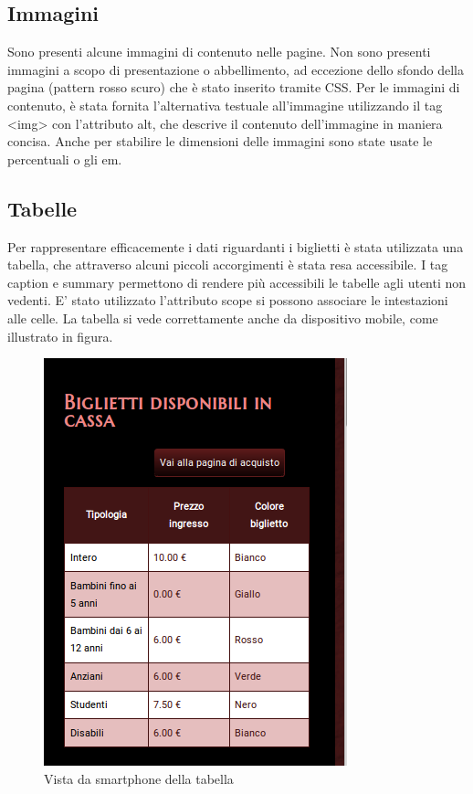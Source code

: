 \documentclass[10pt,a4paper,onecolumn]{article}
\begin{document}
\subsection{Immagini}
Sono presenti alcune immagini di contenuto nelle pagine. Non sono presenti immagini a scopo di presentazione o abbellimento, ad eccezione dello sfondo della pagina (pattern rosso scuro) che è stato inserito tramite CSS.
Per le immagini di contenuto, è stata fornita l'alternativa testuale all'immagine utilizzando il tag <img> con l'attributo alt, che descrive il contenuto dell'immagine in maniera concisa.
Anche per stabilire le dimensioni delle immagini sono state usate le percentuali o gli em.

\subsection{Tabelle}
Per rappresentare efficacemente i dati riguardanti i biglietti è stata utilizzata una tabella, che attraverso alcuni piccoli accorgimenti è stata resa accessibile.
I tag caption e summary permettono di rendere più accessibili le tabelle agli utenti non vedenti. E' stato utilizzato l’attributo scope si possono associare le intestazioni alle celle.
La tabella si vede correttamente anche da dispositivo mobile, come illustrato in figura.

\begin{figure}[h]
\centering
\includegraphics[scale=0.30]{vista_mobile_tabella.png}
\caption{Vista da smartphone della tabella}
\end{figure}
\end{document}
